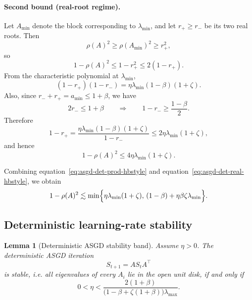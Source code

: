 \documentclass{article}
\def\eqref#1{equation~\ref{#1}}
\newtheorem{lemma}{Lemma}
\begin{document}
\paragraph{Second bound (real-root regime).}
Let \(A_{\min}\) denote the block corresponding to \(\lambda_{\min}\), and let
\(r_+\ge r_-\) be its two real roots. Then
\[
\rho(A)^2\ge \rho(A_{\min})^2\ge r_+^2,
\]
so
\[
1-\rho(A)^2\le 1-r_+^2\le 2(1-r_+).
\]
From the characteristic polynomial at \(\lambda_{\min}\),
\[
(1-r_+)(1-r_-)=\eta\lambda_{\min}(1-\beta)(1+\zeta).
\]
Also, since \(r_-+r_+=a_{\min}\le 1+\beta\), we have
\[
2r_-\le 1+\beta
\qquad\Longrightarrow\qquad
1-r_-\ge \frac{1-\beta}{2}.
\]
Therefore
\[
1-r_+
=
\frac{\eta\lambda_{\min}(1-\beta)(1+\zeta)}{1-r_-}
\le
2\eta\lambda_{\min}(1+\zeta),
\]
and hence
\begin{equation}
\label{eq:asgd-det-real-hbstyle}
1-\rho(A)^2\le 4\eta\lambda_{\min}(1+\zeta).
\end{equation}

Combining \eqref{eq:asgd-det-prod-hbstyle} and
\eqref{eq:asgd-det-real-hbstyle}, we obtain
\begin{equation}
\label{eq:asgd-gap-etabeta-zeta-hbstyle}
1-\rho(A)^2
\lesssim
\min\Bigl\{
\eta\lambda_{\min}(1+\zeta),
\,
(1-\beta)+\eta\beta\zeta\lambda_{\min}
\Bigr\}.
\end{equation}

\subsection{Deterministic learning-rate stability}

\begin{lemma}[Deterministic ASGD stability band]
\label{lem:ASGD-det-band-hbstyle}
Assume \(\eta>0\). The deterministic ASGD iteration
\[
S_{t+1}=AS_tA^\top
\]
is stable, i.e. all eigenvalues of every \(A_i\) lie in the open unit disk, if
and only if
\[
0<\eta<
\frac{2(1+\beta)}
{\bigl(1-\beta+\zeta(1+\beta)\bigr)\lambda_{\max}}.
\]
\end{lemma}
\end{document}
